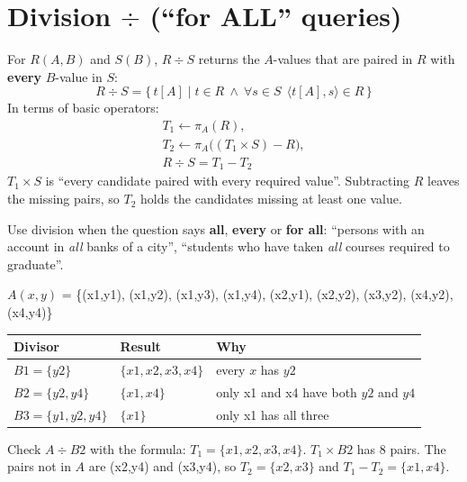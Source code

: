 \documentclass[10pt,a4paper]{article}
\begin{document}
\section{Division $\div$ (``for ALL'' queries)}

\begin{keybox}[Definition]
For $R(A, B)$ and $S(B)$, $R \div S$ returns the $A$-values that are paired in $R$ with \textbf{every} $B$-value in $S$:
\[ R \div S = \{\, t[A] \mid t \in R \ \wedge\ \forall s \in S\ \ \langle t[A], s\rangle \in R \,\} \]
In terms of basic operators:
\begin{gather*}
T_1 \leftarrow \pi_A(R), \\
T_2 \leftarrow \pi_A\big((T_1 \times S) - R\big), \\
R \div S = T_1 - T_2
\end{gather*}
$T_1 \times S$ is ``every candidate paired with every required value''. Subtracting $R$ leaves the missing pairs, so $T_2$ holds the candidates missing at least one value.
\end{keybox}

Use division when the question says \textbf{all}, \textbf{every} or \textbf{for all}: ``persons with an account in \emph{all} banks of a city'', ``students who have taken \emph{all} courses required to graduate''.

\begin{exbox}
\small
\begin{minipage}[t]{0.3\linewidth}
$A(x,y)$ = \{(x1,y1), (x1,y2), (x1,y3), (x1,y4), (x2,y1), (x2,y2), (x3,y2), (x4,y2), (x4,y4)\}
\end{minipage}\hfill
\begin{minipage}[t]{0.66\linewidth}
\begin{tabular}{@{}lll@{}}
\toprule
\textbf{Divisor} & \textbf{Result} & \textbf{Why}\\\midrule
$B1 = \{y2\}$ & $\{x1, x2, x3, x4\}$ & every $x$ has $y2$\\
$B2 = \{y2, y4\}$ & $\{x1, x4\}$ & only x1 and x4 have both $y2$ and $y4$\\
$B3 = \{y1, y2, y4\}$ & $\{x1\}$ & only x1 has all three\\
\bottomrule
\end{tabular}
\end{minipage}

\smallskip
Check $A \div B2$ with the formula: $T_1 = \{x1,x2,x3,x4\}$. $T_1 \times B2$ has 8 pairs. The pairs not in $A$ are (x2,y4) and (x3,y4), so $T_2 = \{x2, x3\}$ and $T_1 - T_2 = \{x1, x4\}$.
\end{exbox}
\end{document}

